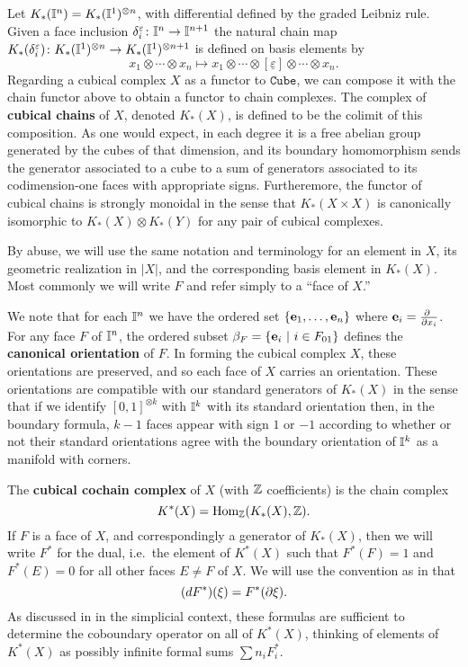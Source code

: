Let $K_*(\mathbb{I}^n) = K_*(\mathbb{I}^1)^{ \otimes n}$, with differential defined by the graded Leibniz rule.
Given a face inclusion $\delta_i^{\varepsilon} \colon \mathbb{I}^n \to \mathbb{I}^{n+1}$ the natural chain map $K_*(\delta_i^{\varepsilon}) \colon K_*(\mathbb{I}^1)^{ \otimes n} \to K_*(\mathbb{I}^1)^{ \otimes n+1}$ is defined on basis elements by
\begin{equation*}
	x_1 \otimes \cdots \otimes x_n \mapsto
	x_1 \otimes \cdots \otimes [\underline{\varepsilon}] \otimes \cdots \otimes x_n.
\end{equation*}
Regarding a cubical complex $X$ as a functor to $\mathtt{Cube}$, we can compose it with the chain functor above to obtain a functor to chain complexes.
The complex of \textbf{cubical chains} of $X$, denoted $K_*(X)$, is defined to be the colimit of this composition.
As one would expect, in each degree it is a free abelian group generated by the cubes of that dimension, and its boundary homomorphism sends the
generator associated to a cube to a sum of generators associated to its codimension-one faces with appropriate signs.
Furtheremore, the functor of cubical chains is strongly monoidal in the sense that $K_*(X \times X)$ is canonically isomorphic to $K_*(X) \otimes K_*(Y)$ for any pair of cubical complexes.

By abuse, we will use the same notation and terminology for an element in $X$, its geometric realization in $|X|$,
and the corresponding basis element in $K_*(X)$.
Most commonly we will write $F$ and refer simply to a ``face of $X$.''

We note that for each $\mathbb{I}^n$ we have the ordered set $\{\mathbf{e}_1, \dots, \mathbf{e}_n\}$ where $\mathbf{e}_i = \frac{\partial\ }{\partial x_i}$.
For any face $F$ of $\mathbb{I}^n$, the ordered subset $\beta_F = \{\mathbf{e}_i\ |\ i \in F_{01}\}$ defines the \textbf{canonical orientation} of $F$.
In forming the cubical complex $X$, these orientations are preserved, and so each face of $X$ carries an orientation.
These orientations are compatible with our standard generators of $K_*(X)$ in the sense that if we identify $[0,1]^{ \otimes k}$ with $\mathbb{I}^k$ with its standard orientation then, in the boundary formula, $k-1$ faces appear with sign $1$ or $-1$ according to whether or not their standard orientations agree with the boundary orientation of $\mathbb{I}^k$ as a manifold with corners.

The \textbf{cubical cochain complex} of $X$ (with $\mathbb{Z}$ coefficients) is the chain complex
\[
K^*(X) = \textup{Hom}_{\mathbb{Z}}(K_*(X), \mathbb{Z}).
\]
If $F$ is a face of $X$, and correspondingly a generator of $K_*(X)$, then we will write $F^*$ for the dual, i.e.\ the element of $K^*(X)$ such that $F^*(F) = 1$ and $F^*(E) = 0$ for all other faces $E\neq F$ of $X$.
We will use the convention as in \cite[Section 42]{Mun84} that
$$(dF^*)(\xi) = F^*(\partial \xi).$$
As discussed in \cite[Section 42]{Mun84} in the simplicial context, these formulas are sufficient to determine the coboundary operator on all of $K^*(X)$, thinking of elements of $K^*(X)$ as possibly infinite formal sums $\sum n_i F_i^*$.

